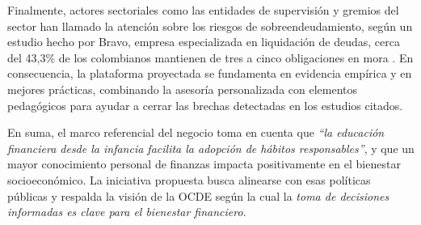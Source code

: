Finalmente, actores sectoriales como las entidades de supervisión y gremios del sector han llamado la atención sobre los riesgos de sobreendeudamiento, según un estudio hecho por Bravo, empresa especializada en liquidación de deudas, cerca del 43,3\% de los colombianos mantienen de tres a cinco obligaciones en mora \parencite{Infobae01}. En consecuencia, la plataforma proyectada se fundamenta en evidencia empírica y en mejores prácticas, combinando la asesoría personalizada con elementos pedagógicos para ayudar a cerrar las brechas detectadas en los estudios citados.

En suma, el marco referencial del negocio toma en cuenta que \textit{``la educación financiera desde la infancia facilita la adopción de hábitos responsables''}, y que un mayor conocimiento personal de finanzas impacta positivamente en el bienestar socioeconómico. La iniciativa propuesta busca alinearse con esas políticas públicas y respalda la visión de la OCDE según la cual la \textit{toma de decisiones informadas es clave para el bienestar financiero}.
